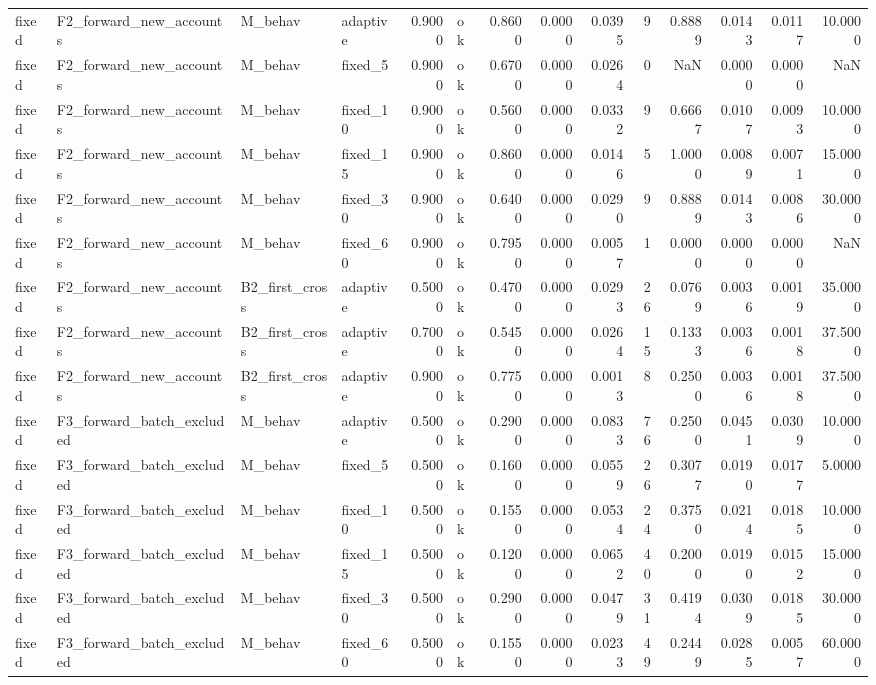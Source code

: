 \begin{table}
\begin{tabular}{llllrlrrrrrrrr}
fixed & F2\_forward\_new\_accounts & M\_behav & adaptive & 0.9000 & ok & 0.8600 & 0.0000 & 0.0395 & 9 & 0.8889 & 0.0143 & 0.0117 & 10.0000 \\
fixed & F2\_forward\_new\_accounts & M\_behav & fixed\_5 & 0.9000 & ok & 0.6700 & 0.0000 & 0.0264 & 0 & NaN & 0.0000 & 0.0000 & NaN \\
fixed & F2\_forward\_new\_accounts & M\_behav & fixed\_10 & 0.9000 & ok & 0.5600 & 0.0000 & 0.0332 & 9 & 0.6667 & 0.0107 & 0.0093 & 10.0000 \\
fixed & F2\_forward\_new\_accounts & M\_behav & fixed\_15 & 0.9000 & ok & 0.8600 & 0.0000 & 0.0146 & 5 & 1.0000 & 0.0089 & 0.0071 & 15.0000 \\
fixed & F2\_forward\_new\_accounts & M\_behav & fixed\_30 & 0.9000 & ok & 0.6400 & 0.0000 & 0.0290 & 9 & 0.8889 & 0.0143 & 0.0086 & 30.0000 \\
fixed & F2\_forward\_new\_accounts & M\_behav & fixed\_60 & 0.9000 & ok & 0.7950 & 0.0000 & 0.0057 & 1 & 0.0000 & 0.0000 & 0.0000 & NaN \\
fixed & F2\_forward\_new\_accounts & B2\_first\_cross & adaptive & 0.5000 & ok & 0.4700 & 0.0000 & 0.0293 & 26 & 0.0769 & 0.0036 & 0.0019 & 35.0000 \\
fixed & F2\_forward\_new\_accounts & B2\_first\_cross & adaptive & 0.7000 & ok & 0.5450 & 0.0000 & 0.0264 & 15 & 0.1333 & 0.0036 & 0.0018 & 37.5000 \\
fixed & F2\_forward\_new\_accounts & B2\_first\_cross & adaptive & 0.9000 & ok & 0.7750 & 0.0000 & 0.0013 & 8 & 0.2500 & 0.0036 & 0.0018 & 37.5000 \\
fixed & F3\_forward\_batch\_excluded & M\_behav & adaptive & 0.5000 & ok & 0.2900 & 0.0000 & 0.0833 & 76 & 0.2500 & 0.0451 & 0.0309 & 10.0000 \\
fixed & F3\_forward\_batch\_excluded & M\_behav & fixed\_5 & 0.5000 & ok & 0.1600 & 0.0000 & 0.0559 & 26 & 0.3077 & 0.0190 & 0.0177 & 5.0000 \\
fixed & F3\_forward\_batch\_excluded & M\_behav & fixed\_10 & 0.5000 & ok & 0.1550 & 0.0000 & 0.0534 & 24 & 0.3750 & 0.0214 & 0.0185 & 10.0000 \\
fixed & F3\_forward\_batch\_excluded & M\_behav & fixed\_15 & 0.5000 & ok & 0.1200 & 0.0000 & 0.0652 & 40 & 0.2000 & 0.0190 & 0.0152 & 15.0000 \\
fixed & F3\_forward\_batch\_excluded & M\_behav & fixed\_30 & 0.5000 & ok & 0.2900 & 0.0000 & 0.0479 & 31 & 0.4194 & 0.0309 & 0.0185 & 30.0000 \\
fixed & F3\_forward\_batch\_excluded & M\_behav & fixed\_60 & 0.5000 & ok & 0.1550 & 0.0000 & 0.0233 & 49 & 0.2449 & 0.0285 & 0.0057 & 60.0000 \\

\end{tabular}
\end{table}

